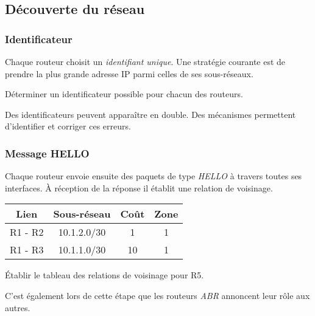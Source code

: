 \documentclass[a4paper,11pt]{article}
\begin{document}
\subsection{Découverte du réseau}
\subsubsection{Identificateur}
Chaque routeur choisit un \emph{identifiant unique}. Une stratégie courante est de prendre la plus grande adresse IP parmi celles de ses sous-réseaux.
\begin{activite}
Déterminer un identificateur possible pour chacun des routeurs.
\end{activite}
\begin{aretenir}[Remarque]
Des identificateurs peuvent apparaître en double. Des mécanismes permettent d'identifier et corriger ces erreurs.
\end{aretenir}
\begin{center}
\end{center}
\subsubsection{Message HELLO}
Chaque routeur envoie ensuite des paquets de type \emph{HELLO} à travers toutes ses interfaces. À réception de la réponse il établit une relation de voisinage.
\begin{center}
    \begin{tabular}{|*{4}{c|}}
        \hline
        Lien & Sous-réseau & Coût & Zone \\
        \hline
        R1 - R2 & 10.1.2.0/30 & 1 & 1 \\
        \hline
        R1 - R3 & 10.1.1.0/30 & 10 & 1 \\
        \hline
    \end{tabular}
\end{center}
\begin{activite}
Établir le tableau des relations de voisinage pour R5.
\end{activite}
\begin{aretenir}[Remarque]
C'est également lors de cette étape que les routeurs \emph{ABR} annoncent leur rôle aux autres.
\end{aretenir}
\end{document}
